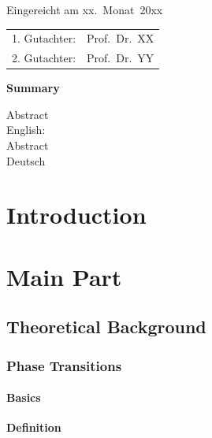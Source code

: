 \thispagestyle{empty}\vspace*{48em}

Eingereicht am xx.~Monat~20xx\vspace{1.5em}
\par{\large\begin{tabular}{ll}
 1. Gutachter: & Prof.~Dr.~XX \\
 2. Gutachter: & Prof.~Dr.~YY \\
\end{tabular}}


\newpage
\begin{center}\large\bfseries Summary\end{center}


Abstract \\ 
English: \\

\vspace{20em}
Abstract \\ 
Deutsch \\
 
 

\tableofcontents




\chapter{Introduction}



\chapter{Main Part}
\section{Theoretical Background}
\subsection{Phase Transitions}
	\subsubsection{Basics}
		\textbf{Definition}
		

